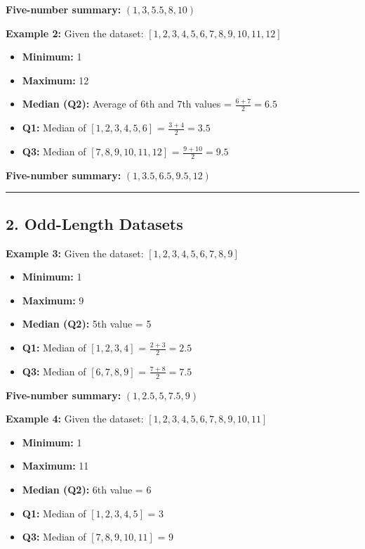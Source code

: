 \documentclass[a4paper,10pt]{article}
\begin{document}
\textbf{Five-number summary:} \((1, 3, 5.5, 8, 10)\)

\vspace{0.5cm}

\textbf{Example 2:}  
Given the dataset: \([1, 2, 3, 4, 5, 6, 7, 8, 9, 10, 11, 12]\)

\begin{itemize}
    \item \textbf{Minimum:} 1
    \item \textbf{Maximum:} 12
    \item \textbf{Median (Q2):} Average of 6th and 7th values = \(\frac{6+7}{2} = 6.5\)
    \item \textbf{Q1:} Median of \([1, 2, 3, 4, 5, 6]\) = \(\frac{3+4}{2} = 3.5\)
    \item \textbf{Q3:} Median of \([7, 8, 9, 10, 11, 12]\) = \(\frac{9+10}{2} = 9.5\)
\end{itemize}

\textbf{Five-number summary:} \((1, 3.5, 6.5, 9.5, 12)\)

\vspace{0.5cm}

\hrule
\vspace{0.5cm}

\subsection*{2. Odd-Length Datasets}

\textbf{Example 3:}  
Given the dataset: \([1, 2, 3, 4, 5, 6, 7, 8, 9]\)

\begin{itemize}
    \item \textbf{Minimum:} 1
    \item \textbf{Maximum:} 9
    \item \textbf{Median (Q2):} 5th value = 5
    \item \textbf{Q1:} Median of \([1, 2, 3, 4]\) = \(\frac{2+3}{2} = 2.5\)
    \item \textbf{Q3:} Median of \([6, 7, 8, 9]\) = \(\frac{7+8}{2} = 7.5\)
\end{itemize}

\textbf{Five-number summary:} \((1, 2.5, 5, 7.5, 9)\)

\vspace{0.5cm}

\textbf{Example 4:}  
Given the dataset: \([1, 2, 3, 4, 5, 6, 7, 8, 9, 10, 11]\)

\begin{itemize}
    \item \textbf{Minimum:} 1
    \item \textbf{Maximum:} 11
    \item \textbf{Median (Q2):} 6th value = 6
    \item \textbf{Q1:} Median of \([1, 2, 3, 4, 5]\) = 3
    \item \textbf{Q3:} Median of \([7, 8, 9, 10, 11]\) = 9
\end{itemize}
\end{document}
